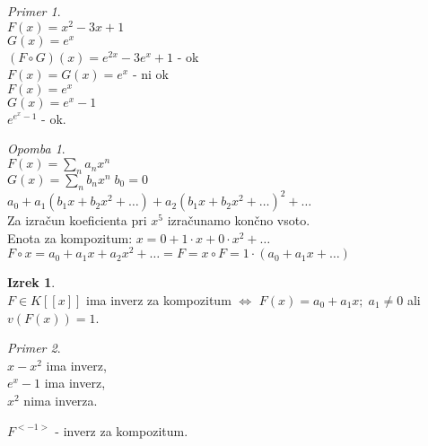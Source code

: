 \documentclass[a4paper, 12pt]{book}
\theoremstyle{definition}
\newtheorem{theorem}[counter]{Izrek}
\theoremstyle{remark}
\newtheorem*{ex}{Primer}
\newtheorem*{rem}{Opomba}
\begin{document}
\begin{ex} \text{} \\
  $F(x) = x^2 - 3x + 1$ \\
  $G(x) = e^x$ \\
  $(F \circ G)(x) = e^{2x} - 3e^x + 1$ - ok \\
  $F(x) = G(x) = e^x$ - ni ok \\
  $F(x) = e^x$ \\
  $G(x) = e^x - 1$ \\
  $e^{e^x-1}$ - ok.
\end{ex}
\begin{rem} \text{} \\
  $F(x) = \sum_n a_n x^n$ \\
  $G(x) = \sum_n b_n x^n \; b_0 = 0$ \\
  $a_0 + a_1(b_1 x + b_2 x^2 + \dots) + a_2(b_1 x + b_2 x^2 + \dots)^2 + \dots$ \\
  Za izračun koeficienta pri $x^5$ izračunamo končno vsoto. \\
  Enota za kompozitum: $x = 0 + 1 \cdot x + 0 \cdot x^2 + \dots$ \\
  $F \circ x = a_0 + a_1 x + a_2 x^2 + \dots = F = x \circ F = 1 \cdot (a_0 + a_1 x + \dots)$
\end{rem}
\begin{theorem} \text{} \\
  $F \in K[[x]]$ ima inverz za kompozitum $\iff$ $F(x) = a_0 + a_1 x; \; a_1 \neq 0$ ali $v(F(x)) = 1$.
\end{theorem}
\begin{ex} \text{} \\
  $x - x^2$ ima inverz, \\
  $e^x - 1$ ima inverz, \\
  $x^2$ nima inverza.
\end{ex}
$F^{<-1>}$ - inverz za kompozitum.
\end{document}
